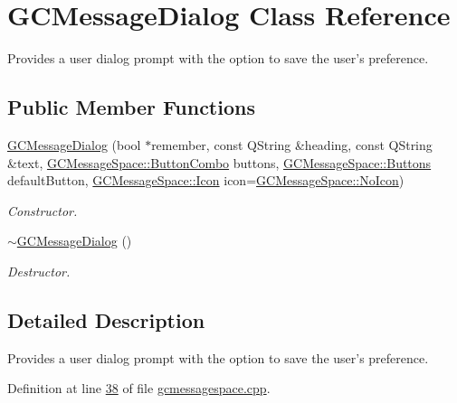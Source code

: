 \hypertarget{class_g_c_message_dialog}{\section{\-G\-C\-Message\-Dialog \-Class \-Reference}
\label{class_g_c_message_dialog}
}


\-Provides a user dialog prompt with the option to save the user's preference.  


\subsection*{\-Public \-Member \-Functions}
\begin{DoxyCompactItemize}
\item 
\hyperlink{class_g_c_message_dialog_ad2f8910da38a44831096a9c7f1e08323}{\-G\-C\-Message\-Dialog} (bool $\ast$remember, const \-Q\-String \&heading, const \-Q\-String \&text, \hyperlink{namespace_g_c_message_space_ac1db082c29062fe6508ba03bf76bea44}{\-G\-C\-Message\-Space\-::\-Button\-Combo} buttons, \hyperlink{namespace_g_c_message_space_a631906a7d53f30328cf2249a00078b5b}{\-G\-C\-Message\-Space\-::\-Buttons} default\-Button, \hyperlink{namespace_g_c_message_space_a67e94586e09cbc305257fbcdd7b686e2}{\-G\-C\-Message\-Space\-::\-Icon} icon=\hyperlink{namespace_g_c_message_space_a67e94586e09cbc305257fbcdd7b686e2a54bba077357d6db019fb791266e133f0}{\-G\-C\-Message\-Space\-::\-No\-Icon})
\begin{DoxyCompactList}\small\item\em \-Constructor. \end{DoxyCompactList}\item 
\hyperlink{class_g_c_message_dialog_ae8f647f3c0a75c154f451d0a4fd6bd9d}{$\sim$\-G\-C\-Message\-Dialog} ()
\begin{DoxyCompactList}\small\item\em \-Destructor. \end{DoxyCompactList}\end{DoxyCompactItemize}


\subsection{\-Detailed \-Description}
\-Provides a user dialog prompt with the option to save the user's preference. 

\-Definition at line \hyperlink{gcmessagespace_8cpp_source_l00038}{38} of file \hyperlink{gcmessagespace_8cpp_source}{gcmessagespace.\-cpp}.



